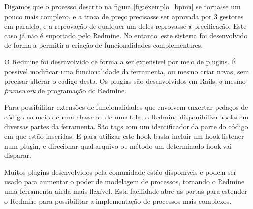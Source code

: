 Digamos que o processo descrito na figura \ref{fig:exemplo_bpmn} se tornasse um pouco mais complexo, e a troca de preço precisasse ser aprovada por 3 gestores em paralelo, e a reprovação de qualquer um deles reprovasse a precificação. Este caso já não é suportado pelo Redmine. No entanto, este sistema foi desenvolvido de forma a permitir a criação de funcionalidades complementares.

O Redmine foi desenvolvido de forma a ser extensível por meio de plugins. É possível modificar uma funcionalidade da ferramenta, ou mesmo criar novas, sem precisar alterar o código desta. Os plugins são desenvolvidos em Rails, o mesmo \textit{framework} de programação do Redmine. 

Para possibilitar extensões de funcionalidades que envolvem enxertar pedaços de código no meio de uma classe ou de uma tela, o Redmine disponibiliza hooks em diversas partes da ferramenta. São tags com um identificador da parte do código em que estão inseridas. E para utilizar este hook basta incluir um hook listener num plugin, e direcionar qual arquivo ou método um determinado hook vai disparar.

Muitos plugins desenvolvidos pela comunidade estão disponíveis e podem ser usado para aumentar o poder de modelagem de processos, tornando o Redmine uma ferramenta ainda mais flexível. Esta facilidade abre as portas para estender o Redmine para possibilitar a implementação de processos mais complexos.  